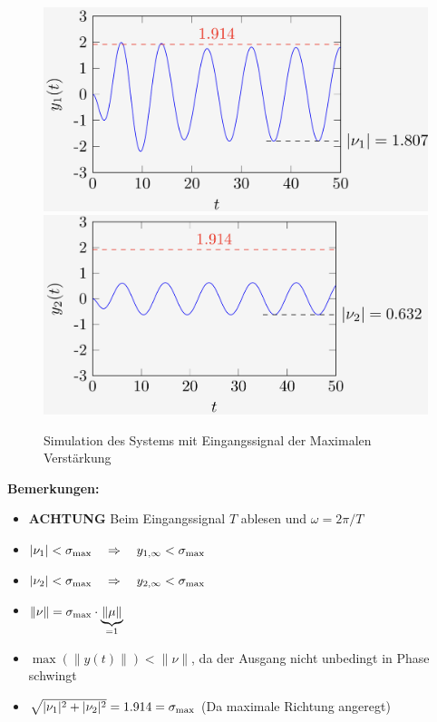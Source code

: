         \begin{figure}[H]
            \centering
            \includegraphics[width = 0.4\linewidth]{images/07/freq_resp_bsp_1.jpeg}
            \includegraphics[width = 0.4\linewidth]{images/07/freq_resp_bsp_2.jpeg}
            \caption{Simulation des Systems mit Eingangssignal der Maximalen Verstärkung}
        \end{figure}
        
        \textbf{Bemerkungen:}
        \begin{itemize}
            \item \textbf{ACHTUNG} Beim Eingangssignal $T$ ablesen und $\omega = 2\pi/T$
            \item $|\nu_1| < \sigma_\textnormal{max} \quad\Rightarrow\quad y_{1,\infty} < \sigma_\textnormal{max}$
            \item $|\nu_2| < \sigma_\textnormal{max} \quad\Rightarrow\quad y_{2,\infty} < \sigma_\textnormal{max}$
            \item $\|\nu\|=\sigma_{\textnormal{max}}\cdot\underbrace{\|\mu\|}_{=1}$
            \item $\max(\|y(t)\|) < \|\nu\|$, da der Ausgang nicht unbedingt in Phase schwingt
            \item $\sqrt{|\nu_1|^2 + |\nu_2|^2} = 1.914 = \sigma_\textnormal{max}$ (Da maximale Richtung angeregt)
        \end{itemize}